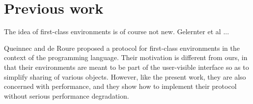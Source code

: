 \section{Previous work}

The idea of first-class environments is of course not new.
Gelernter et al \cite{Gelernter:1987:EFC:41625.41634} ...

Queinnec and de Roure \cite{Queinnec:1996:SCT:232627.232653} proposed
a protocol for first-class environments in the context of the
\scheme{} programming language.  Their motivation is different from
ours, in that their environments are meant to be part of the
user-visible interface so as to simplify sharing of various objects.
However, like the present work, they are also concerned with
performance, and they show how to implement their protocol without
serious performance degradation.
